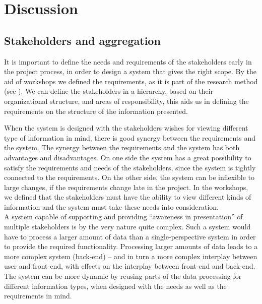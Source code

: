 \chapter{Discussion}
\label{chapter:discussion}

\section{Stakeholders and aggregation} %
\label{sec:discussion_stakeholders'_and_aggregation}
It is important to define the needs and requirements of the stakeholders 
early in the project process, in order to design a system that gives the right scope. 
By the aid of workshops we defined the requirements, as it is part of the 
research method (see ). We can define the stakeholders in 
a hierarchy, based on their organizational structure, and areas of 
responsibility, this aids us in defining the requirements on the structure of 
the information presented.

When the system is designed with the stakeholders wishes for viewing different type of information in mind, there is good synergy between the requirements and the system. The synergy between the requirements and the system has 
both advantages and disadvantages. On one side the system has a great 
possibility to satisfy the requirements and needs of the stakeholders, since 
the system is tightly connected to the requirements. On the other side, the 
system can be inflexible to large changes, if the requirements change late in 
the project. In the workshops, we defined that the stakeholders must have the 
ability to view different kinds of information and the system must take these 
needs into consideration. \\

A system capable of supporting and providing 
“awareness in presentation” of multiple stakeholders is by the very nature 
quite complex. Such a system would have to process a larger amount of data than 
a single-perspective system in order to provide the required functionality. 
Processing larger amounts of data leads to a more complex system (back-end) – 
and in turn a more complex interplay between user and front-end, with effects 
on the interplay between front-end and back-end. The system can be more 
dynamic by reusing parts of the data processing for 
different information types, when designed with the needs as well as the 
requirements in mind. 

